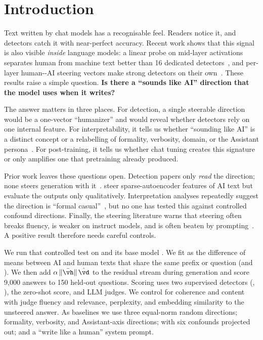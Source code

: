 \section{Introduction}
\label{sec:intro}

Text written by chat models has a recognisable feel. Readers notice it, and detectors catch it with near-perfect accuracy. Recent work shows that this signal is also visible \emph{inside} language models: a linear probe on mid-layer activations separates human from machine text better than 16 dedicated detectors~\citep{quaremba2026linear}, and per-layer human-\versus-AI steering vectors make strong detectors on their own~\citep{vishnyakov2026svdetect,liang2026steer}.
These results raise a simple question. {\bf Is there a ``sounds like AI'' direction that the model uses when it writes?}

The answer matters in three places. For detection, a single steerable direction would be a one-vector ``humanizer'' and would reveal whether detectors rely on one internal feature. For interpretability, it tells us whether ``sounding like AI'' is a distinct concept or a relabelling of formality, verbosity, domain, or the Assistant persona~\citep{lu2026assistant}. For post-training, it tells us whether chat tuning creates this signature or only amplifies one that pretraining already produced.

Prior work leaves these questions open. Detection papers only \emph{read} the direction; none steers generation with it~\citep{quaremba2026linear,vishnyakov2026svdetect,liang2026steer}. \citet{kuznetsov2025feature} steer sparse-autoencoder features of AI text but evaluate the outputs only qualitatively. Interpretation analyses repeatedly suggest the direction is ``formal \versus casual''~\citep{vishnyakov2026svdetect,liang2026steer}, but no one has tested this against controlled confound directions. Finally, the steering literature warns that steering often breaks fluency, is weaker on instruct models, and is often beaten by prompting~\citep{wu2025axbench,steerweak2026}. A positive result therefore needs careful controls.

We run that controlled test on \qwen and its base model \qwenbase. We fit \dai as the difference of means between AI and human texts that share the same prefix or question (\hape and \hcthree). We then add $\alpha\,\|\bar\vh\|\,\hat\vd$ to the residual stream during generation and score 9,000 answers to 150 held-out questions. Scoring uses two supervised detectors (\desklib, \fakespot), the zero-shot \binoculars score, and LLM judges. We control for coherence and content with judge fluency and relevance, perplexity, and embedding similarity to the unsteered answer. As baselines we use three equal-norm random directions; formality, verbosity, and Assistant-axis directions; \dai with six confounds projected out; and a ``write like a human'' system prompt.


